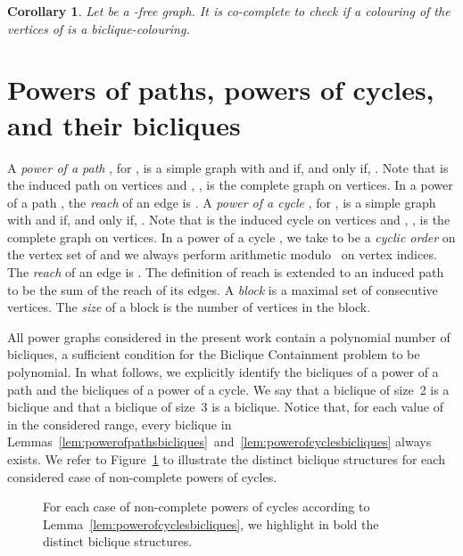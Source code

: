 \documentclass{article}
\newtheorem{corollary}[theorem]{Corollary}
\begin{document}
\begin{corollary}
\label{cor:checkbicliquecolouring}
Let  be a -free graph. It is co-complete to check
if a colouring of the vertices of  is a biclique-colouring.
\end{corollary}


\section{Powers of paths, powers of cycles, and their bicliques}
\label{sec:powerofcyclesandbicliques}
A \emph{power of a path} , for , is a simple
graph with  and  if,
and only if, . Note that  is the induced path  on
 vertices and , , is the complete graph  on 
vertices. 
In a power of a path , the \emph{reach} of an edge  is . A \emph{power of a cycle} , for , is a
simple graph with  and  if,
and only if, . Note that 
is the induced cycle  on  vertices and , ,
is the complete graph  on  vertices. 
In a power of a cycle , we take  to be a
\emph{cyclic order} on the vertex set of  and we always perform arithmetic modulo~ on
vertex indices. The \emph{reach} of an edge  is . The definition of reach is extended to an induced path to be
the sum of the reach of its edges. A \emph{block} is a maximal set of
consecutive vertices. The \emph{size} of a block is the number of vertices in
the block.

All power graphs considered in the present work contain a polynomial
number of bicliques, a sufficient condition for the {\sc Biclique Containment}
problem to be polynomial. In what follows, we explicitly identify the bicliques
of a power of a path and the bicliques of a power of a cycle. 
We say that a biclique of size~2 is a  biclique and that a biclique of size~3
is a  biclique. Notice that, for each value of  in the considered
range, every biclique in
Lemmas~\ref{lem:powerofpathsbicliques}~and~\ref{lem:powerofcyclesbicliques} always exists.
We refer to Figure~\ref{fig:l4} to illustrate the distinct biclique structures
for each considered case of non-complete powers of cycles.

\begin{figure}[t]
\centering
	\qquad
	\qquad
	\caption{For each case of non-complete powers of
	cycles according to Lemma~\ref{lem:powerofcyclesbicliques}, we highlight in
	bold the distinct biclique structures.}
	\label{fig:l4}
\end{figure}
	
\end{document}

